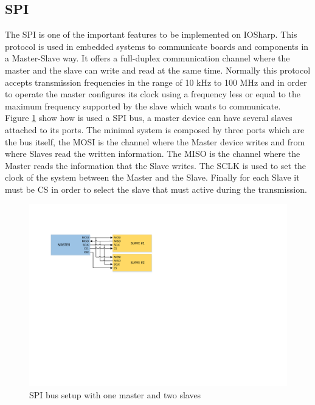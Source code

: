 \subsection{SPI}\label{SS:IOSharp-SPI}
The \gls{SPI} is one of the important features to be implemented on IOSharp. This protocol is used in embedded systems to communicate boards and components in a Master-Slave way. It offers a full-duplex communication channel where the master and the slave can write and read at the same time. Normally this protocol accepts transmission frequencies in the range of 10 kHz to 100 MHz and in order to operate the master configures its clock using a frequency less or equal to the maximum frequency supported by the slave which wants to communicate.
\\
Figure \ref{fig:spi-modules} show how is used a SPI bus, a master device can have several slaves attached to its ports. The minimal system is composed by three ports which are the bus itself, the \gls{MOSI} is the channel where the Master device writes and from where Slaves read the written information. The \gls{MISO} is the channel where the Master reads the information that the Slave writes. The \gls{SCLK} is used to set the clock of the system between the Master and the Slave. Finally for each Slave it must be \gls{CS} in order to select the slave that must active during the transmission.
\begin{figure}[H]\begin{center}
 \centering
  \captionsetup{justification=centering}
  \includegraphics[scale=0.9]{pictures/iosharp/spi-modules}
  \caption{SPI bus setup with one master and two slaves \label{fig:spi-modules}}
\end{center}\end{figure}


